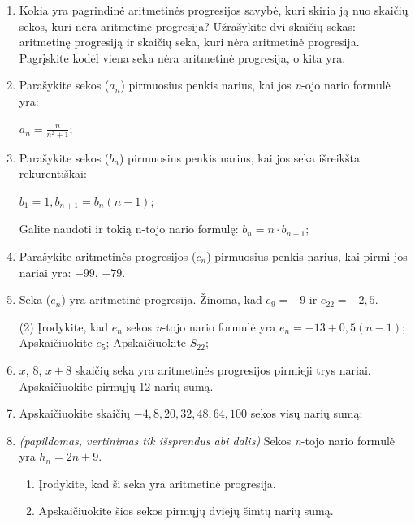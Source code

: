 \documentclass[a4paper]{article}
\begin{document}
\begin{enumerate}
      \item Kokia yra pagrindinė aritmetinės progresijos savybė, kuri skiria ją
            nuo skaičių sekos, kuri nėra aritmetinė progresija? Užrašykite dvi
            skaičių sekas: aritmetinę progresiją ir skaičių seka, kuri nėra
            aritmetinė progresija. Pagrįskite kodėl viena seka nėra
            aritmetinė progresija, o kita yra.

      \item Parašykite sekos ($a_{n}$) pirmuosius penkis
            narius, kai jos \textit{n}-ojo nario formulė yra:

            $a_{n}=\frac{n}{n^{2} + 1}$;

      \item Parašykite sekos ($b_{n}$) pirmuosius penkis
            narius, kai jos seka išreikšta rekurentiškai:

            $b_1 = 1, b_{n+1}=b_{n}(n+1)$;

            Galite naudoti ir tokią n-tojo nario formulę: $b_{n}=n \cdot
                  b_{n-1}$;

      \item Parašykite aritmetinės progresijos ($c_{n}$) pirmuosius penkis
            narius, kai pirmi jos nariai yra: $-99$, $-79$.

      \item Seka ($e_{n}$) yra aritmetinė progresija. Žinoma, kad $e_{9}=-9$ ir
            $e_{22}=-2,5$.

            \begin{tasks}[item-format={\normalfont}, after-item-skip=2mm](2)
                  \task* Įrodykite, kad $e_{n}$ sekos \textit{n}-tojo nario
                  formulė yra $e_{n}=-13+0,5(n-1)$;
                  \task Apskaičiuokite $e_{5}$;
                  \task Apskaičiuokite $S_{22}$;
            \end{tasks}

      \item $ x $, $ 8 $, $ x + 8$ skaičių seka yra aritmetinės progresijos
            pirmieji trys nariai. Apskaičiuokite pirmųjų 12 narių sumą.

      \item Apskaičiuokite skaičių $ -4, 8, 20, 32, 48, 64, 100 $ sekos visų narių sumą;

      \item \textit{(papildomas, vertinimas tik išsprendus abi dalis)} Sekos
            \textit{n}-tojo nario formulė yra
            $h_{n} = 2n+9$.
            \begin{enumerate}[label= (\alph*)]
                  \item Įrodykite, kad ši seka yra aritmetinė progresija.
                  \item Apskaičiuokite šios sekos pirmųjų dviejų šimtų narių
                        sumą.
            \end{enumerate}
\end{enumerate}
\end{document}

